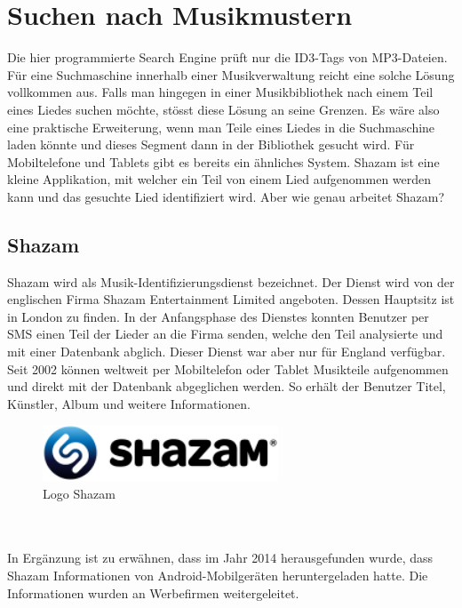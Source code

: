 \documentclass[12pt,a4paper,ngerman]{report}
\begin{document}
\section{Suchen nach Musikmustern}
Die hier programmierte Search Engine prüft nur die ID3-Tags von MP3-Dateien. Für eine Suchmaschine innerhalb einer Musikverwaltung reicht eine solche Lösung vollkommen aus. Falls man hingegen in einer Musikbibliothek nach einem Teil eines Liedes suchen möchte, stösst diese Lösung an seine Grenzen. Es wäre also eine praktische Erweiterung, wenn man Teile eines Liedes in die Suchmaschine laden könnte und dieses Segment dann in der Bibliothek gesucht wird. Für Mobiltelefone und Tablets gibt es bereits ein ähnliches System. Shazam ist eine kleine Applikation, mit welcher ein Teil von einem Lied aufgenommen werden kann und das gesuchte Lied identifiziert wird. Aber wie genau arbeitet Shazam?
\subsection{Shazam}
Shazam wird als Musik-Identifizierungsdienst bezeichnet. Der Dienst wird von der englischen Firma Shazam Entertainment Limited angeboten. Dessen Hauptsitz ist in London zu finden. In der Anfangsphase des Dienstes konnten Benutzer per SMS einen Teil der Lieder an die Firma senden, welche den Teil analysierte und mit einer Datenbank abglich. Dieser Dienst war aber nur für England verfügbar. Seit 2002 können weltweit per Mobiltelefon oder Tablet Musikteile aufgenommen und direkt mit der Datenbank abgeglichen werden. So erhält der Benutzer Titel, Künstler, Album und weitere Informationen.
\begin{figure}[h!]
\centering
\includegraphics[width=7cm]{img/shazam_logo.png}
\caption{Logo Shazam\protect\footnotemark}
\end{figure}
\\
\\
In Ergänzung ist zu erwähnen, dass im Jahr 2014 herausgefunden wurde, dass Shazam Informationen von Android-Mobilgeräten heruntergeladen hatte. Die Informationen wurden an Werbefirmen weitergeleitet.
\end{document}
